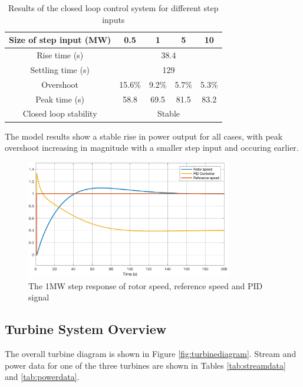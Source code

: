  \begin {table} [h]
\begin{center}
\caption{Results of the closed loop control system for different step inputs} \label{tab:controlresults} 
\begin{tabular}{ |c|c|c|c|c|}
 \hline
 Size of step input (MW) & 0.5 & 1 & 5 & 10\\
 \hline
  Rise time (s) & \multicolumn{4}{|c|}{38.4}\\ 
 \hline
  Settling time (s) & \multicolumn{4}{|c|}{129}\\ 
  \hline
  Overshoot & 15.6\% & 9.2\% & 5.7\% & 5.3\%\\ 
  \hline
  Peak time (s) & 58.8 & 69.5 & 81.5 & 83.2 \\
 \hline
 Closed loop stability & \multicolumn{4}{|c|}{Stable}\\
 \hline
\end{tabular}
\end{center}  
\end {table}

The model results show a stable rise in power output for all cases, with peak overshoot increasing in magnitude with a smaller step input and occuring earlier.


\begin{figure} [h]
\centering
\includegraphics[width=0.8\textwidth]{./pictures/scopenew.eps}
  \caption{The 1MW step response of rotor speed, reference speed and PID signal} \label{fig:scope}
  \end{figure}
  
\pagebreak
\subsection{Turbine System Overview}
The overall turbine diagram is shown in Figure \ref{fig:turbinediagram}. Stream and power data for one of the three turbines are shown in Tables \ref{tab:streamdata} and \ref{tab:powerdata}.

